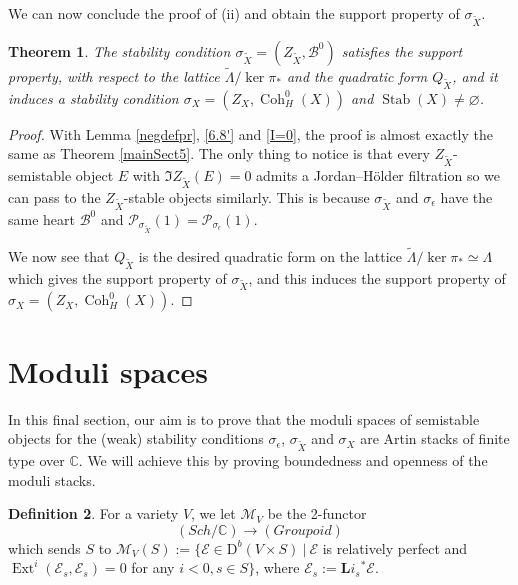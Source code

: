 \documentclass[12pt]{amsart}
\newtheorem{theorem}{Theorem}[section]
\theoremstyle{definition}
\newtheorem{definition}[theorem]{Definition}
\DeclareMathOperator{\Ext}{Ext}
\DeclareMathOperator{\Coh}{Coh}
\DeclareMathOperator{\Stab}{Stab}
\begin{document}
We can now conclude the proof of (ii) and obtain the support property of $\sigma_{\widetilde{X}}$.
\begin{theorem}
The stability condition $\sigma_{\widetilde{X}}=(Z_{\widetilde{X}},\mathcal{B}^0)$ satisfies the support property,
with respect to the lattice $\widetilde{\Lambda}/ \ker \pi_\ast$ and the quadratic form $Q_{\widetilde{X}}$,
and it induces a stability condition $\sigma_X=(Z_X,\Coh^0_H(X))$ and $\Stab(X) \neq \varnothing$.
\end{theorem}
\begin{proof}
With Lemma \ref{negdefpr}, \ref{6.8'} and \ref{I=0},
the proof is almost exactly the same as Theorem \ref{mainSect5}.
The only thing to notice is that every $Z_{\widetilde{X}}$-semistable object $E$ with $\Im Z_{\widetilde{X}}(E)=0$ admits a Jordan--Hölder filtration so we can pass to the $Z_{\widetilde{X}}$-stable objects similarly.
This is because $\sigma_{\widetilde{X}}$ and $\sigma_\epsilon$ have the same heart $\mathcal{B}^0$ and $\mathcal{P}_{\sigma_{\widetilde{X}}}(1) =\mathcal{P}_{\sigma_\epsilon}(1)$. 

We now see that $Q_{\widetilde{X}}$ is the desired quadratic form on the lattice $\widetilde{\Lambda}/ \ker \pi_\ast \simeq \Lambda$ which gives the support property of $\sigma_{\widetilde{X}}$,
and this induces the support property of $\sigma_X=(Z_X,\Coh^0_H(X))$.
\end{proof}


\section{Moduli spaces}

In this final section, our aim is to prove that the moduli spaces of semistable objects for the (weak) stability conditions $\sigma_\epsilon$, 
$\sigma_{\widetilde{X}}$ and $\sigma_X$ are Artin stacks of finite type over $\mathbb{C}$.
We will achieve this by proving boundedness and openness of the moduli stacks.

\begin{definition}
For a variety $V$, we let $\mathcal{M}_V$ be the 2-functor
\[(Sch/\mathbb{C}) \longrightarrow (Groupoid)\]
which sends $S$ to $\mathcal{M}_V(S):=\{ \mathcal{E} \in \mathrm{D}^b(V\times S) \  | \ \mathcal{E}$ is relatively perfect and $\Ext^i(\mathcal{E}_s, \mathcal{E}_s)=0 $ for any $i<0, s\in S\}$,
where $\mathcal{E}_s:=\mathbf{L}{i_s}^\ast \mathcal{E}$.
\end{definition}
\end{document}
